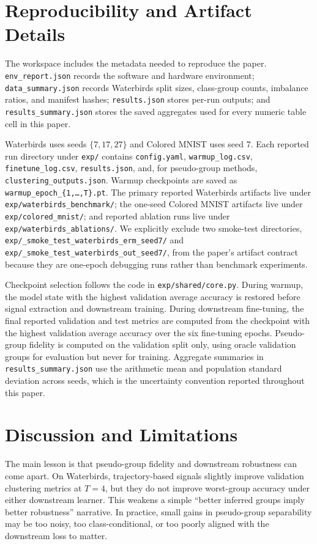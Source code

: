 \documentclass{article}
\begin{document}
\section{Reproducibility and Artifact Details}
\label{sec:repro}
The workspace includes the metadata needed to reproduce the paper. \texttt{env\_report.json} records the software and hardware environment; \texttt{data\_summary.json} records Waterbirds split sizes, class-group counts, imbalance ratios, and manifest hashes; \texttt{results.json} stores per-run outputs; and \texttt{results\_summary.json} stores the saved aggregates used for every numeric table cell in this paper.

Waterbirds uses seeds $\{7,17,27\}$ and Colored MNIST uses seed $7$. Each reported run directory under \texttt{exp/} contains \texttt{config.yaml}, \texttt{warmup\_log.csv}, \texttt{finetune\_log.csv}, \texttt{results.json}, and, for pseudo-group methods, \texttt{clustering\_outputs.json}. Warmup checkpoints are saved as \texttt{warmup\_epoch\_\{1,\dots,T\}.pt}. The primary reported Waterbirds artifacts live under \texttt{exp/waterbirds\_benchmark/}; the one-seed Colored MNIST artifacts live under \texttt{exp/colored\_mnist/}; and reported ablation runs live under \texttt{exp/waterbirds\_ablations/}. We explicitly exclude two smoke-test directories, \texttt{exp/\_smoke\_test\_waterbirds\_erm\_seed7/} and \texttt{exp/\_smoke\_test\_waterbirds\_out\_seed7/}, from the paper's artifact contract because they are one-epoch debugging runs rather than benchmark experiments.

Checkpoint selection follows the code in \texttt{exp/shared/core.py}. During warmup, the model state with the highest validation average accuracy is restored before signal extraction and downstream training. During downstream fine-tuning, the final reported validation and test metrics are computed from the checkpoint with the highest validation average accuracy over the six fine-tuning epochs. Pseudo-group fidelity is computed on the validation split only, using oracle validation groups for evaluation but never for training. Aggregate summaries in \texttt{results\_summary.json} use the arithmetic mean and population standard deviation across seeds, which is the uncertainty convention reported throughout this paper.

\section{Discussion and Limitations}
\label{sec:discussion}
The main lesson is that pseudo-group fidelity and downstream robustness can come apart. On Waterbirds, trajectory-based signals slightly improve validation clustering metrics at $T=4$, but they do not improve worst-group accuracy under either downstream learner. This weakens a simple ``better inferred groups imply better robustness'' narrative. In practice, small gains in pseudo-group separability may be too noisy, too class-conditional, or too poorly aligned with the downstream loss to matter.
\end{document}
